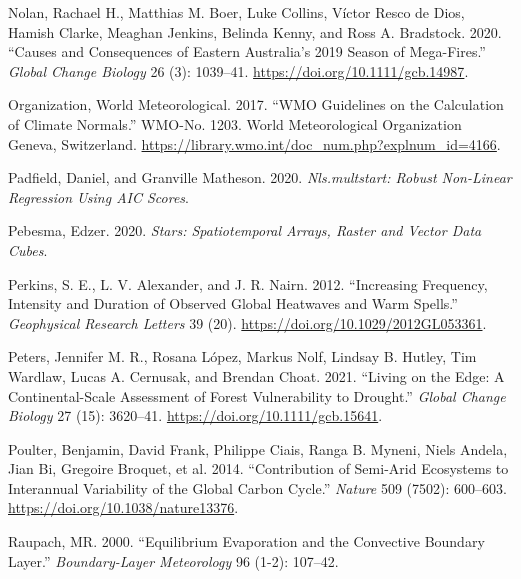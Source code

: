 \documentclass[
]{article}
\newlength{\cslhangindent}
\newlength{\cslentryspacingunit} %
\newenvironment{CSLReferences}[2] %
 {%
  \setlength{\parindent}{0pt}
  \ifodd #1
  \let\oldpar\par
  \def\par{\hangindent=\cslhangindent\oldpar}
  \fi
  \setlength{\parskip}{#2\cslentryspacingunit}
 }%
 {}
\begin{document}
\begin{CSLReferences}{1}{0}
\leavevmode{}%
Nolan, Rachael H., Matthias M. Boer, Luke Collins, Víctor Resco de Dios,
Hamish Clarke, Meaghan Jenkins, Belinda Kenny, and Ross A. Bradstock.
2020. {``Causes and Consequences of Eastern {Australia}'s
2019 Season of Mega-Fires.''} \emph{Global Change Biology}
26 (3): 1039--41. \url{https://doi.org/10.1111/gcb.14987}.

\leavevmode{}%
Organization, World Meteorological. 2017. {``{WMO} Guidelines on the
Calculation of Climate Normals.''} WMO-No. 1203. {World Meteorological
Organization Geneva, Switzerland}.
\url{https://library.wmo.int/doc_num.php?explnum_id=4166}.

\leavevmode{}%
Padfield, Daniel, and Granville Matheson. 2020. \emph{Nls.multstart:
{Robust Non}-{Linear Regression} Using {AIC Scores}}.

\leavevmode{}%
Pebesma, Edzer. 2020. \emph{Stars: {Spatiotemporal Arrays}, {Raster} and
{Vector Data Cubes}}.

\leavevmode{}%
Perkins, S. E., L. V. Alexander, and J. R. Nairn. 2012. {``Increasing
Frequency, Intensity and Duration of Observed Global Heatwaves and Warm
Spells.''} \emph{Geophysical Research Letters} 39 (20).
\url{https://doi.org/10.1029/2012GL053361}.

\leavevmode{}%
Peters, Jennifer M. R., Rosana López, Markus Nolf, Lindsay B. Hutley,
Tim Wardlaw, Lucas A. Cernusak, and Brendan Choat. 2021. {``Living on
the Edge: {A} Continental-Scale Assessment of Forest Vulnerability to
Drought.''} \emph{Global Change Biology} 27 (15): 3620--41.
\url{https://doi.org/10.1111/gcb.15641}.

\leavevmode{}%
Poulter, Benjamin, David Frank, Philippe Ciais, Ranga B. Myneni, Niels
Andela, Jian Bi, Gregoire Broquet, et al. 2014. {``Contribution of
Semi-Arid Ecosystems to Interannual Variability of the Global Carbon
Cycle.''} \emph{Nature} 509 (7502): 600--603.
\url{https://doi.org/10.1038/nature13376}.

\leavevmode{}%
Raupach, MR. 2000. {``Equilibrium Evaporation and the Convective
Boundary Layer.''} \emph{Boundary-Layer Meteorology} 96 (1-2): 107--42.


\end{CSLReferences}
\end{document}
